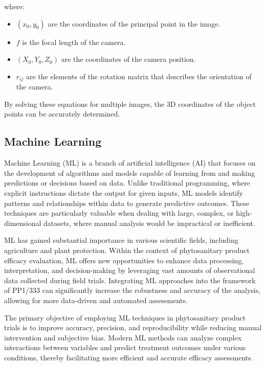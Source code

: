 \documentclass[12pt,a4paper,oneside]{report}
\begin{document}
where:
\begin{itemize}
    \item \( (x_0, y_0) \) are the coordinates of the principal point in the image.
    \item \( f \) is the focal length of the camera.
    \item \( (X_0, Y_0, Z_0) \) are the coordinates of the camera position.
    \item \( r_{ij} \) are the elements of the rotation matrix that describes the orientation of the camera.
\end{itemize}

By solving these equations for multiple images, the 3D coordinates of the object 
points can be accurately determined.


\subsection{Machine Learning}

Machine Learning (ML) is a branch of artificial intelligence (AI) that 
focuses on the development of algorithms and models capable of learning 
from and making predictions or decisions based on data. Unlike traditional 
programming, where explicit instructions dictate the output for given inputs, 
ML models identify patterns and relationships within data to generate 
predictive outcomes. These techniques are particularly valuable when 
dealing with large, complex, or high-dimensional datasets, where manual 
analysis would be impractical or inefficient.

ML has gained substantial importance in various scientific fields, including 
agriculture and plant protection. Within the context of phytosanitary product 
efficacy evaluation, ML offers new opportunities to enhance data processing, 
interpretation, and decision-making by leveraging vast amounts of observational 
data collected during field trials. Integrating ML approaches into the framework 
of PP1/333 can significantly increase the robustness and accuracy of the analysis, 
allowing for more data-driven and automated assessments.

The primary objective of employing ML techniques in phytosanitary product trials 
is to improve accuracy, precision, and reproducibility while reducing manual 
intervention and subjective bias. Modern ML methods can analyze complex interactions 
between variables and predict treatment outcomes under various conditions, thereby 
facilitating more efficient and accurate efficacy assessments.
\end{document}
